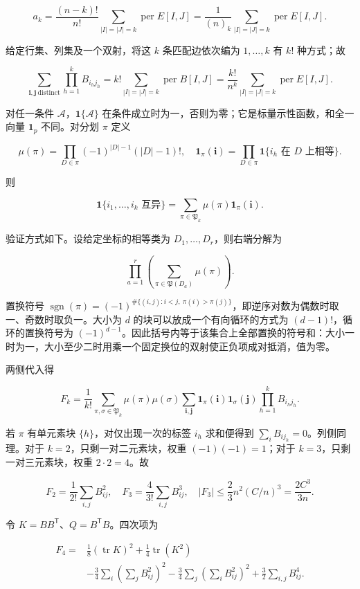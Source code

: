 \documentclass[11pt,a4paper]{article}
\begin{document}
\[a_k=\frac{(n-k)!}{n!}\sum_{|I|=|J|=k}\operatorname{per}E[I,J]
=\frac1{(n)_k}\sum_{|I|=|J|=k}\operatorname{per}E[I,J].\]

给定行集、列集及一个双射，将这 \(k\) 条匹配边依次编为 \(1,\ldots,k\) 有 \(k!\) 种方式；故

\[\sum_{\boldsymbol i,\boldsymbol j\ \mathrm{distinct}}\prod_{h=1}^kB_{i_hj_h}
=k!\sum_{|I|=|J|=k}\operatorname{per}B[I,J]
=\frac{k!}{n^k}\sum_{|I|=|J|=k}\operatorname{per}E[I,J].\]

对任一条件 \(\mathcal A\)，\(\mathbf1\{\mathcal A\}\) 在条件成立时为一，否则为零；它是标量示性函数，和全一向量 \(\mathbf1_p\) 不同。对分划 \(\pi\) 定义

\[\mu(\pi)=\prod_{D\in\pi}(-1)^{|D|-1}(|D|-1)!,\quad
\mathbf1_\pi(\boldsymbol i)=\prod_{D\in\pi}\mathbf1\{i_h\text{ 在 }D\text{ 上相等}\}.\]

则

\[\mathbf1\{i_1,\ldots,i_k\text{ 互异}\}
=\sum_{\pi\in\mathfrak P_k}\mu(\pi)\mathbf1_\pi(\boldsymbol i).\]

验证方式如下。设给定坐标的相等类为 \(D_1,\ldots,D_r\)，则右端分解为

\[\prod_{a=1}^r\left(\sum_{\pi\in\mathfrak P(D_a)}\mu(\pi)\right).\]

置换符号 \(\operatorname{sgn}(\pi)=(-1)^{\#\{(i,j):i<j,\ \pi(i)>\pi(j)\}}\)，即逆序对数为偶数时取一、奇数时取负一。大小为 \(d\) 的块可以放成一个有向循环的方式为 \((d-1)!\)，循环的置换符号为 \((-1)^{d-1}\)。因此括号内等于该集合上全部置换的符号和：大小一时为一，大小至少二时用乘一个固定换位的双射使正负项成对抵消，值为零。

两侧代入得

\[F_k=\frac1{k!}\sum_{\pi,\sigma\in\mathfrak P_k}\mu(\pi)\mu(\sigma)
\sum_{\boldsymbol i,\boldsymbol j}\mathbf1_\pi(\boldsymbol i)\mathbf1_\sigma(\boldsymbol j)
\prod_{h=1}^kB_{i_hj_h}.\]

若 \(\pi\) 有单元素块 \(\{h\}\)，对仅出现一次的标签 \(i_h\) 求和便得到 \(\sum_iB_{ij_h}=0\)。列侧同理。对于 \(k=2\)，只剩一对二元素块，权重 \((-1)(-1)=1\)；对于 \(k=3\)，只剩一对三元素块，权重 \(2\cdot2=4\)。故

\[F_2=\frac1{2!}\sum_{i,j}B_{ij}^2,\quad
F_3=\frac4{3!}\sum_{i,j}B_{ij}^3,\quad
|F_3|\le\frac23n^2(C/n)^3=\frac{2C^3}{3n}.\]

令 \(K=BB^{\mathsf T}\)、\(Q=B^{\mathsf T}B\)。四次项为

\[\begin{aligned}
F_4={}&\frac18(\operatorname{tr}K)^2+\frac14\operatorname{tr}(K^2)\\
&-\frac34\sum_i\left(\sum_jB_{ij}^2\right)^2
-\frac34\sum_j\left(\sum_iB_{ij}^2\right)^2
+\frac32\sum_{i,j}B_{ij}^4.
\end{aligned}\]
\end{document}
